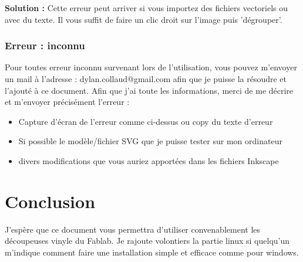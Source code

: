 \documentclass[a4paper,oneside,12pt]{report}
\begin{document}
\textbf{Solution :} Cette erreur peut arriver si vous importez des fichiers vectoriels ou avec du texte. Il vous suffit de faire un clic droit sur l'image puis 'dégrouper'.
\newpage

\subsection{Erreur : inconnu}

Pour toutes erreur inconnu survenant lors de l'utilisation, vous pouvez m'envoyer un mail à l'adresse : dylan.collaud@gmail.com afin que je puisse la résoudre et l'ajouté à ce document. Afin que j'ai toute les informations, merci de me décrire et m'envoyer précisément l'erreur : \\

\begin{itemize}
	\item Capture d'écran de l'erreur comme ci-dessus ou copy du texte d'erreur
	\item Si possible le modèle/fichier SVG que je puisse tester sur mon ordinateur
	\item divers modifications que vous auriez apportées dans les fichiers Inkscape
\end{itemize}

\newpage
\chapter{Conclusion}
J'espère que ce document vous permettra d'utiliser convenablement les découpeuses vinyle du Fablab. Je rajoute volontiers la partie linux si quelqu'un m'indique comment faire une installation simple et efficace comme pour windows.\\






\appendix

\end{document}
